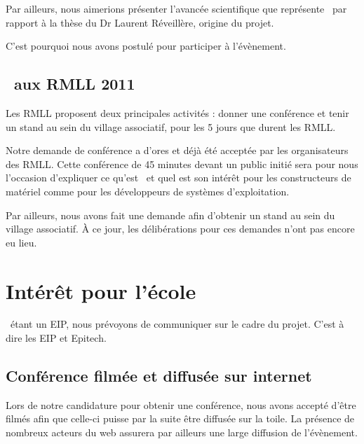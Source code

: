 \documentclass{rtxreport}
\begin{document}
Par ailleurs, nous aimerions présenter l'avancée scientifique que représente
\rtx\ par rapport à la thèse du Dr Laurent Réveillère, origine du projet.

C'est pourquoi nous avons postulé pour participer à l'évènement.


\section{\rtx\ aux RMLL 2011}

Les RMLL proposent deux principales activités : donner une conférence et tenir
un stand au sein du village associatif, pour les 5 jours que durent les RMLL.

Notre demande de conférence a d'ores et déjà été acceptée par les organisateurs
des RMLL. Cette conférence de 45 minutes devant un public initié sera pour
nous l'occasion d'expliquer ce qu'est \rtx\ et quel est son intérêt pour les
constructeurs de matériel comme pour les développeurs de systèmes
d'exploitation.

Par ailleurs, nous avons fait une demande afin d'obtenir un stand au sein du
village associatif. À ce jour, les délibérations pour ces demandes n'ont pas
encore eu lieu.


\chapter{Intérêt pour l'école}

\rtx\ étant un EIP, nous prévoyons de communiquer sur le cadre du projet. C'est
à dire les EIP et Epitech.

\section{Conférence filmée et diffusée sur internet}

Lors de notre candidature pour obtenir une conférence, nous avons accepté
d'être filmés afin que celle-ci puisse par la suite être diffusée sur la toile.
La présence de nombreux acteurs du web assurera par ailleurs une large
diffusion de l'évènement.
\end{document}
